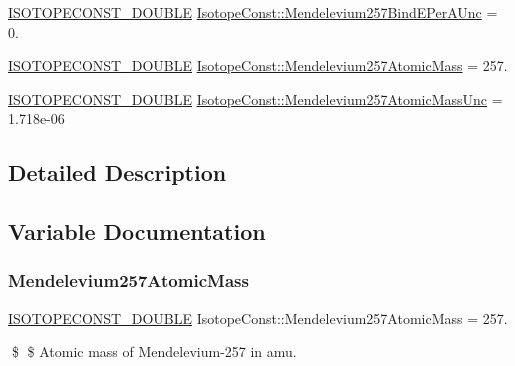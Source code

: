 \begin{DoxyCompactItemize}
\item 
\mbox{\hyperlink{group___isotope_const-_macros_ga8f45a7272ce02c0b4c65c44636ed719a}{I\+S\+O\+T\+O\+P\+E\+C\+O\+N\+S\+T\+\_\+\+D\+O\+U\+B\+LE}} \mbox{\hyperlink{group___isotope_const-_mendelevium-_md257_gac16e04ea83f062db58135950ad0305e4}{Isotope\+Const\+::\+Mendelevium257\+Bind\+E\+Per\+A\+Unc}} = 0.
\item 
\mbox{\hyperlink{group___isotope_const-_macros_ga8f45a7272ce02c0b4c65c44636ed719a}{I\+S\+O\+T\+O\+P\+E\+C\+O\+N\+S\+T\+\_\+\+D\+O\+U\+B\+LE}} \mbox{\hyperlink{group___isotope_const-_mendelevium-_md257_gaf2c98bd1f4411d9a713fbdadbdc3bfbd}{Isotope\+Const\+::\+Mendelevium257\+Atomic\+Mass}} = 257.
\item 
\mbox{\hyperlink{group___isotope_const-_macros_ga8f45a7272ce02c0b4c65c44636ed719a}{I\+S\+O\+T\+O\+P\+E\+C\+O\+N\+S\+T\+\_\+\+D\+O\+U\+B\+LE}} \mbox{\hyperlink{group___isotope_const-_mendelevium-_md257_ga80d8277965e0dbfb80266ae7b36017d5}{Isotope\+Const\+::\+Mendelevium257\+Atomic\+Mass\+Unc}} = 1.\+718e-\/06
\end{DoxyCompactItemize}


\subsection{Detailed Description}


\subsection{Variable Documentation}
\mbox{\label{group___isotope_const-_mendelevium-_md257_gaf2c98bd1f4411d9a713fbdadbdc3bfbd}} 
\subsubsection{\texorpdfstring{Mendelevium257\+Atomic\+Mass}{Mendelevium257AtomicMass}}
{\footnotesize\ttfamily \mbox{\hyperlink{group___isotope_const-_macros_ga8f45a7272ce02c0b4c65c44636ed719a}{I\+S\+O\+T\+O\+P\+E\+C\+O\+N\+S\+T\+\_\+\+D\+O\+U\+B\+LE}} Isotope\+Const\+::\+Mendelevium257\+Atomic\+Mass = 257.}

\$ \$ Atomic mass of Mendelevium-\/257 in amu. \mbox{\label{group___isotope_const-_mendelevium-_md257_ga80d8277965e0dbfb80266ae7b36017d5}} 

